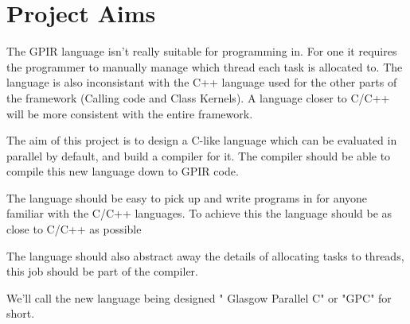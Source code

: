\section{Project Aims}

The GPIR language isn't really suitable for programming in. For one it requires the programmer to manually
manage which thread each task is allocated to. The language is also inconsistant with the C++ language used for 
the other parts of the framework (Calling code and Class Kernels). A language closer to C/C++ will be
more consistent with the entire framework.

The aim of this project is to design a C-like language which can be evaluated in parallel by default, and build
a compiler for it. The compiler should be able to compile this new language down to GPIR code. 

The language should be easy to pick up and write programs in for anyone familiar with the C/C++ languages.
To achieve this the language should be as close to C/C++ as possible 

The language should also abstract away the details of allocating tasks to threads, this job
should be part of the compiler.

We'll call the new language being designed " Glasgow Parallel C" or "GPC" for short.
